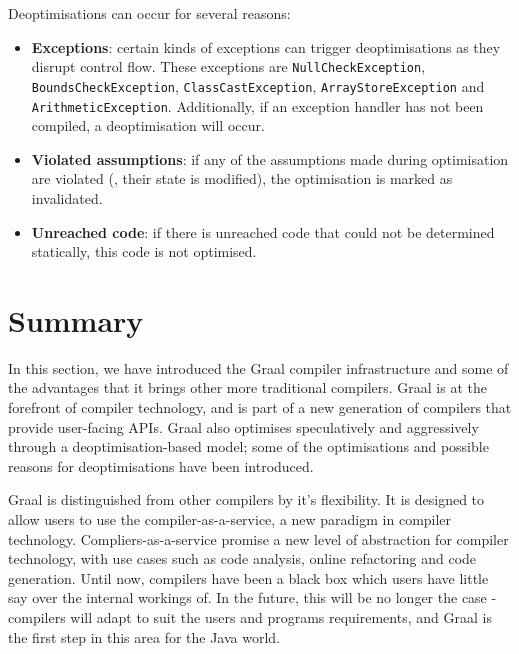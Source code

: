 Deoptimisations can occur for several reasons:

\begin{itemize}
	\item \textbf{Exceptions}: certain kinds of exceptions can trigger deoptimisations as they disrupt control flow. These exceptions are \texttt{NullCheckException}, \texttt{BoundsCheckException}, \texttt{ClassCastException}, \texttt{ArrayStoreException} and \texttt{ArithmeticException}. Additionally, if an exception handler has not been compiled, a deoptimisation will occur.
	
	\item \textbf{Violated assumptions}: if any of the assumptions made during optimisation are violated (\ie, their state is modified), the optimisation is marked as invalidated.
	
	\item \textbf{Unreached code}: if there is unreached code that could not be determined statically, this code is not optimised.
\end{itemize}

\section{Summary} \label{sec:graal/summary}
In this section, we have introduced the Graal compiler infrastructure and some of the advantages that it brings other more traditional compilers. Graal is at the forefront of compiler technology, and is part of a new generation of compilers that provide user-facing APIs. Graal also optimises speculatively and aggressively through a deoptimisation-based model; some of the optimisations and possible reasons for deoptimisations have been introduced.

Graal is distinguished from other compilers by it's flexibility. It is designed to allow users to use the compiler-as-a-service, a new paradigm in compiler technology. Compliers-as-a-service promise a new level of abstraction for compiler technology, with use cases such as code analysis, online refactoring and code generation. Until now, compilers have been a black box which users have little say over the internal workings of. In the future, this will be no longer the case - compilers will adapt to suit the users and programs requirements, and Graal is the first step in this area for the Java world.